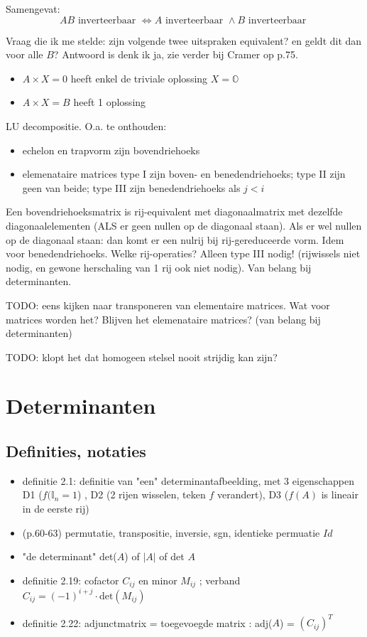 \documentclass{article}
\begin{document}
Samengevat: 
\[ AB \text{ inverteerbaar } \Leftrightarrow A \text{ inverteerbaar } \land B  \text{ inverteerbaar }  \]


Vraag die ik me stelde: zijn volgende twee uitspraken equivalent? en geldt dit dan voor alle $B$? Antwoord is denk ik ja, zie verder bij Cramer op p.75. 
\begin{itemize}
    \item $A\times X = 0$ heeft enkel de triviale oplossing $X=\mathbb{O}$
    \item $A \times X = B$ heeft 1 oplossing 
\end{itemize}

LU decompositie. O.a. te onthouden: 
\begin{itemize}
    \item echelon en trapvorm zijn bovendriehoeks
    \item elemenataire matrices type I zijn boven- en benedendriehoeks; type II zijn geen van beide; type III zijn benedendriehoeks als $j<i$
\end{itemize}

Een bovendriehoeksmatrix is rij-equivalent met diagonaalmatrix met dezelfde diagonaalelementen (ALS er geen nullen op de diagonaal staan). 
Als er wel nullen op de diagonaal staan: dan komt er een nulrij bij rij-gereduceerde vorm. Idem voor benedendriehoeks. Welke rij-operaties? Alleen type III nodig! (rijwissels niet nodig, en gewone herschaling van 1 rij ook niet nodig). Van belang bij determinanten. 

TODO: eens kijken naar transponeren van elementaire matrices. Wat voor matrices worden het? Blijven het elemenataire matrices? (van belang bij determinanten) 

TODO: klopt het dat homogeen stelsel nooit strijdig kan zijn? 

\section{Determinanten}

\subsection{Definities, notaties}

\begin{itemize}
    \item definitie 2.1: definitie van "een" determinantafbeelding, met 3 eigenschappen D1 ($f(\mathbb{I}_n=1$) , D2 (2 rijen wisselen, teken $f$ verandert), D3 ($f(A)$ is lineair in de eerste rij)
    \item (p.60-63)  permutatie, transpositie, inversie, sgn, identieke permuatie $Id$ 
    \item "de determinant" det($A$) of $|A|$ of det $A$
    \item definitie 2.19: cofactor $C_{ij}$ en minor $M_{ij}$ ; verband $C_{ij} = (-1)^{i+j} \cdot \text{det}(M_{ij})$
    \item definitie 2.22: adjunctmatrix = toegevoegde matrix : adj($A$) = $(C_{ij})^T$
\end{itemize}
\end{document}
